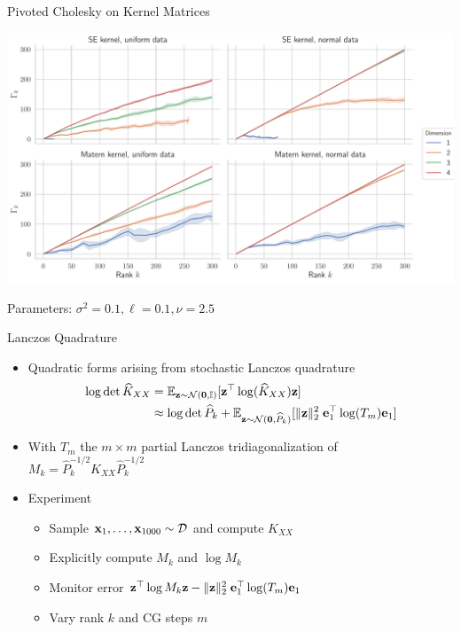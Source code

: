 \documentclass{beamer}
\begin{document}
\begin{frame}{Pivoted Cholesky on Kernel Matrices}
\begin{center}
    \includegraphics[width=\textwidth]{report/res/pivchol_gamma.pdf}
\end{center}
{\tiny Parameters: $\sigma^2 = 0.1, \ell = 0.1, \nu = 2.5$}
\end{frame}

\begin{frame}{Lanczos Quadrature}
\begin{itemize}
    \item Quadratic forms arising from stochastic Lanczos quadrature \begin{align*}
        \log\det \widehat K_{XX} 
        &= \E_{\vect z \sim \mathcal N(\vect 0, \Id)}[\vect z^\top \log(\widehat K_{XX}) \vect z] \\
        &\approx \log\det \widehat P_k + \E_{\vect z \sim \mathcal N(\vect 0, \widehat P_k)}[\norm{\vect z}_2^2 \; \vect e_1^\top \log(T_m) \vect e_1]
    \end{align*}
    \item With $T_m$ the $m\times m$ partial Lanczos tridiagonalization of $M_k = \widehat P^{-1/2}_k \widehat K_{XX} \widehat P^{-1/2}_k$ 
    \item Experiment
    \begin{itemize}
        \item Sample $\boldsymbol{\mathbf{x}}_1, \ldots, \boldsymbol{\mathbf{x}}_{1000} \sim \mathcal D$ and compute $K_{XX}$
        \item Explicitly compute $M_k$ and $\log M_k$
        \item Monitor error $\boldsymbol{\mathbf{z}}^\top \log M_k \boldsymbol{\mathbf{z}} - \Vert \boldsymbol{\mathbf{z}} \Vert_2^2 \; \boldsymbol{\mathbf{e}}_1^\top \log(T_m) \boldsymbol{\mathbf{e}}_1$
        \item Vary rank $k$ and CG steps $m$
    \end{itemize}
\end{itemize}
\end{frame}
\end{document}
